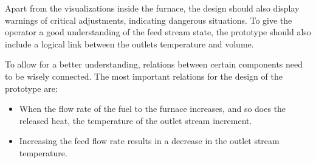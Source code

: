 Apart from the visualizations inside the furnace, the design should also display warnings of critical adjustments, indicating dangerous situations. To give the operator a good understanding of the feed stream state, the prototype should also include a logical link between the outlets temperature and volume.

To allow for a better understanding, relations between certain components need to be wisely connected. The most important relations for the design of the prototype are:

\begin{itemize}
  \item When the flow rate of the fuel to the furnace increases, and so does the released heat, the temperature of the outlet stream increment.
  \item Increasing the feed flow rate results in a decrease in the outlet stream temperature.
\end{itemize}
